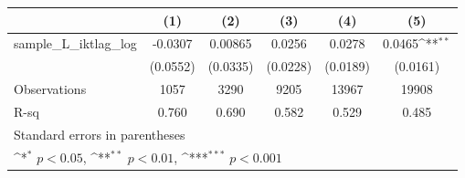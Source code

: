 {
\def\sym#1{\ifmmode^{#1}\else\(^{#1}\)\fi}
\begin{tabular}{l*{5}{c}}
\hline\hline
                &\multicolumn{1}{c}{(1)}         &\multicolumn{1}{c}{(2)}         &\multicolumn{1}{c}{(3)}         &\multicolumn{1}{c}{(4)}         &\multicolumn{1}{c}{(5)}         \\
\hline
sample\_L\_iktlag\_log&  -0.0307         &  0.00865         &   0.0256         &   0.0278         &   0.0465\sym{**} \\
                & (0.0552)         & (0.0335)         & (0.0228)         & (0.0189)         & (0.0161)         \\
\hline
Observations    &     1057         &     3290         &     9205         &    13967         &    19908         \\
R-sq            &    0.760         &    0.690         &    0.582         &    0.529         &    0.485         \\
\hline\hline
\multicolumn{6}{l}{\footnotesize Standard errors in parentheses}\\
\multicolumn{6}{l}{\footnotesize \sym{*} \(p<0.05\), \sym{**} \(p<0.01\), \sym{***} \(p<0.001\)}\\
\end{tabular}
}

